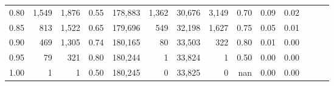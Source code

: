 \begin{tabular}{rrrrrrrrrrrrrr}
0.80 &   1,549 &  1,876 &  0.55 &  178,883 &    1,362 &  30,676 &   3,149 &  0.70 &  0.09 &      0.02 \\
0.85 &     813 &  1,522 &  0.65 &  179,696 &      549 &  32,198 &   1,627 &  0.75 &  0.05 &      0.01 \\
0.90 &     469 &  1,305 &  0.74 &  180,165 &       80 &  33,503 &     322 &  0.80 &  0.01 &      0.00 \\
0.95 &      79 &    321 &  0.80 &  180,244 &        1 &  33,824 &       1 &  0.50 &  0.00 &      0.00 \\
1.00 &       1 &      1 &  0.50 &  180,245 &        0 &  33,825 &       0 &   nan &  0.00 &      0.00 \\
\bottomrule
\end{tabular}
